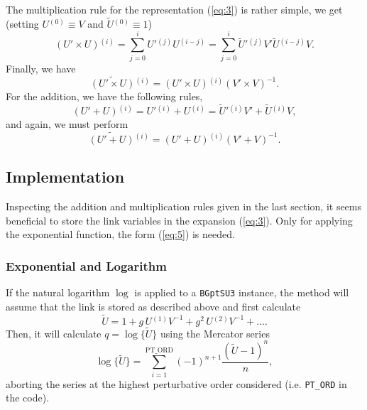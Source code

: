 \documentclass[a4paper]{scrartcl}
\newcommand{\ord}[1]{\ensuremath{^{(#1)}}}
\begin{document}
The multiplication rule for the representation (\ref{eq:3}) is rather
simple, we get (setting $U\ord 0 \equiv V$ and $\tilde U \ord 0 \equiv
1$)
%
\begin{equation}
  \label{eq:8}
  \left ( U' \times U \right)\ord i = \sum_{j = 0}^{i} {U'}\ord j U
  \ord{i-j} = \sum_{j = 0}^{i} {\tilde U '}\hspace{0em}\ord j V' 
  {\tilde U} \ord {i- j}V.
\end{equation}
%
Finally, we have
%
\begin{equation}
  \label{eq:9}
  \widetilde {\left( U' \times U \right)}\ord i = \left ( U' \times U
  \right)\ord i \left(V'\times V \right)^{-1}.
\end{equation}
%
For the addition, we have the following rules,
%
\begin{equation}
  \label{eq:10}
  \left ( U' + U \right)\ord i = {U'}\ord i + U \ord i = {\tilde U'}
  \hspace{0em}\ord i V' + {\tilde U}\ord i V,
\end{equation}
%
and again, we must perform
%
\begin{equation}
  \label{eq:11}
  \widetilde {\left( U' + U\right)}\ord i = \left ( U' + U
  \right)\ord i \left(V' + V \right)^{-1}.
\end{equation}

\subsection*{Implementation}
\label{sec:implementation}

Inspecting the addition and multiplication rules given in the last
section, it seems beneficial to store the link variables in the
expansion (\ref{eq:3}). Only for applying the exponential function,
the form (\ref{eq:5}) is needed.

\subsubsection*{Exponential and Logarithm}
\label{sec:expon-logar}

If the natural logarithm $\log$ is applied to a \texttt{BGptSU3}
instance, the method will assume that the link is stored as described
above and first calculate
%
\begin{equation}
  \label{eq:12}
  \tilde U = 1 + g\,U\ord 1 V^{-1} + g^2\,U \ord 2 V^{-1} + \ldots.
\end{equation}
%
Then, it will calculate $q = \log \{\tilde U\}$ using the Mercator
series
%
\begin{equation}
  \label{eq:13}
  \log \{\tilde U\} = \sum_{i=1}^{\mathrm{PT\_ORD}} 
  (-1)^{n+1} \frac {(\tilde U - 1)^n} n,
\end{equation}
%
aborting the series at the highest perturbative order considered
(i.e. \texttt{PT\_ORD} in the code).
\end{document}
